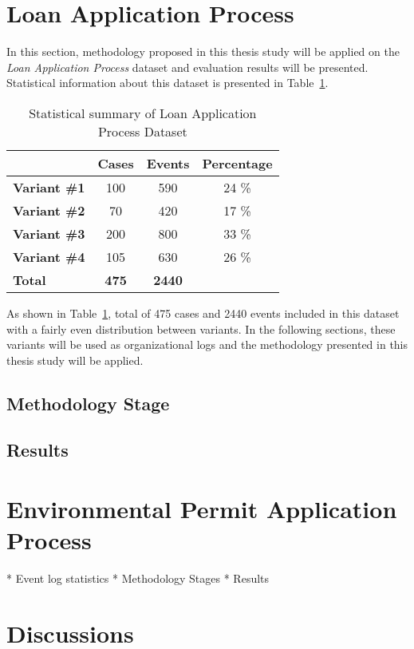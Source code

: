 \section{Loan Application Process}
\label{sec:loan-app-process}
In this section, methodology proposed in this thesis study will be applied on the \textit{Loan Application Process} dataset \cite{loan-app-data} and evaluation results will be presented. Statistical information about this dataset is presented in Table~\ref{table:loan-app-process-summary}.
\begin{table}[]
\centering
\caption{Statistical summary of Loan Application Process Dataset}
\label{table:loan-app-process-summary}
\begin{tabular}{@{}lccc@{}}
\toprule
                  & {\bf Cases} & {\bf Events} & {\bf Percentage} \\ \midrule
{\bf Variant \#1} & 100         & 590          & 24 \%            \\ \midrule
{\bf Variant \#2} & 70          & 420          & 17 \%            \\ \midrule
{\bf Variant \#3} & 200         & 800          & 33 \%            \\ \midrule
{\bf Variant \#4} & 105         & 630          & 26 \%            \\ \midrule
{\bf Total}       & {\bf 475}   & {\bf 2440}   & {\bf }           \\ \bottomrule
\end{tabular}
\end{table}

As shown in Table~\ref{table:loan-app-process-summary}, total of 475 cases and 2440 events included in this dataset with a fairly even distribution between variants. In the following sections, these variants will be used as organizational logs and the methodology presented in this thesis study will be applied.

\subsection{Methodology Stage}
\label{sec:loan-app-methodology}

\subsection{Results}
\label{sec:loan-app-results}


\section{Environmental Permit Application Process}
\label{sec:environmental-permit-application-process}
 
* Event log statistics
* Methodology Stages
* Results

\section{Discussions}
\label{sec:discussions}